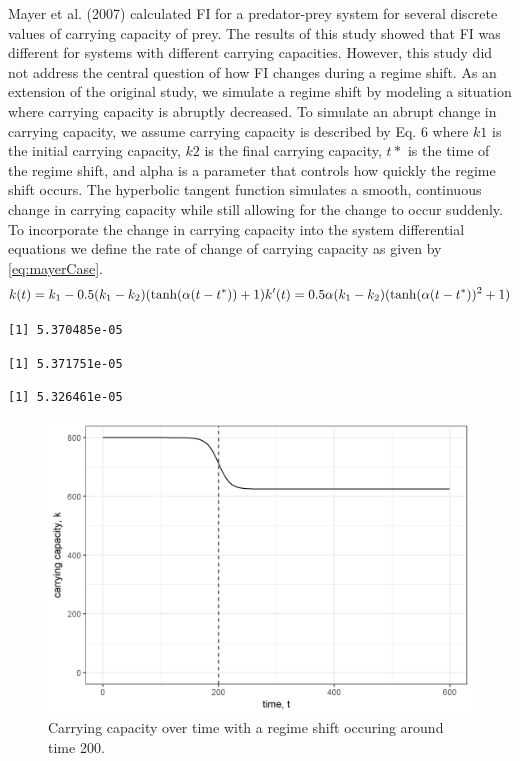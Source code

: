 \documentclass[12pt,twoside]{reedthesis}
\begin{document}
Mayer et al. (2007) calculated FI for a predator-prey system for several
discrete values of carrying capacity of prey. The results of this study
showed that FI was different for systems with different carrying
capacities. However, this study did not address the central question of
how FI changes during a regime shift. As an extension of the original
study, we simulate a regime shift by modeling a situation where carrying
capacity is abruptly decreased. To simulate an abrupt change in carrying
capacity, we assume carrying capacity is described by Eq. 6 where \(k1\)
is the initial carrying capacity, \(k2\) is the final carrying capacity,
\(t*\) is the time of the regime shift, and alpha is a parameter that
controls how quickly the regime shift occurs. The hyperbolic tangent
function simulates a smooth, continuous change in carrying capacity
while still allowing for the change to occur suddenly. To incorporate
the change in carrying capacity into the system differential equations
we define the rate of change of carrying capacity as given by
\eqref{eq:mayerCase}.\\
\begin{equation}  
  k(t) = k_1  - 0.5(k_1-k_2)(\tanh(\alpha (t-t^*))+1)     \\
  k'(t) = 0.5\alpha (k_1-k_2)(\tanh(\alpha(t-t^*))^2 +1)      \\ 
\label{eq:mayerCase}
\end{equation}
\begin{verbatim}
[1] 5.370485e-05
\end{verbatim}
\begin{verbatim}
[1] 5.371751e-05
\end{verbatim}
\begin{verbatim}
[1] 5.326461e-05
\end{verbatim}
\begin{figure}
\includegraphics[width=1\linewidth]{./chapterFiles/fiGuide/figures/kByTime} \caption{Carrying capacity over time with a regime shift occuring around time 200.}\label{fig:kByTime}
\end{figure}
\end{document}
